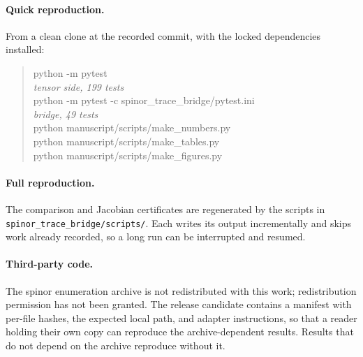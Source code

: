 

\paragraph{Quick reproduction.} From a clean clone at the recorded commit, with
the locked dependencies installed:
\begin{quote}\small\ttfamily
python -m pytest\\
\hspace*{2em}\textrm{\itshape tensor side, 199 tests}\\
python -m pytest -c spinor\_trace\_bridge/pytest.ini\\
\hspace*{2em}\textrm{\itshape bridge, 49 tests}\\
python manuscript/scripts/make\_numbers.py\\
python manuscript/scripts/make\_tables.py\\
python manuscript/scripts/make\_figures.py
\end{quote}

\paragraph{Full reproduction.} The comparison and Jacobian certificates are
regenerated by the scripts in \texttt{spinor\_trace\_bridge/scripts/}. Each
writes its output incrementally and skips work already recorded, so a long run
can be interrupted and resumed.

\paragraph{Third-party code.} The spinor enumeration archive is not
redistributed with this work; redistribution permission has not been granted.
The release candidate contains a manifest with per-file hashes, the expected
local path, and adapter instructions, so that a reader holding their own copy can
reproduce the archive-dependent results. Results that do not depend on the
archive reproduce without it.
